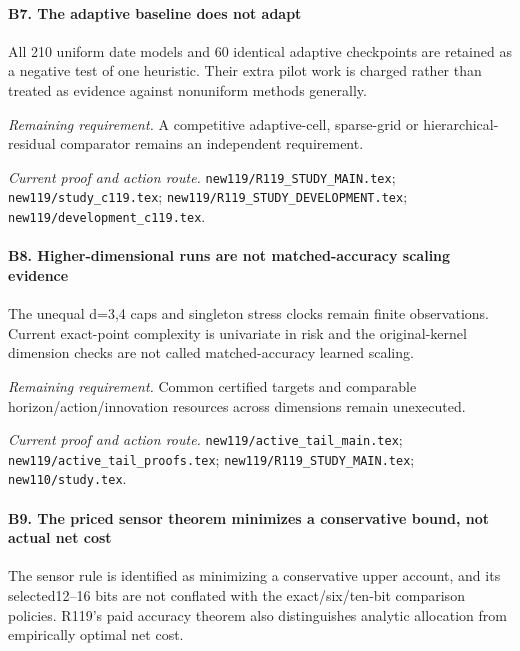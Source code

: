 \paragraph{B7. The adaptive baseline does not adapt}

All 210 uniform date models and 60 identical adaptive checkpoints are retained as a negative test of one heuristic. Their extra pilot work is charged rather than treated as evidence against nonuniform methods generally.

\par\emph{Remaining requirement.} A competitive adaptive-cell, sparse-grid or hierarchical-residual comparator remains an independent requirement.

\par\emph{Current proof and action route.} \nolinkurl{new119/R119_STUDY_MAIN.tex}; \nolinkurl{new119/study_c119.tex}; \nolinkurl{new119/R119_STUDY_DEVELOPMENT.tex}; \nolinkurl{new119/development_c119.tex}.

\paragraph{B8. Higher-dimensional runs are not matched-accuracy scaling evidence}

The unequal d=3,4 caps and singleton stress clocks remain finite observations. Current exact-point complexity is univariate in risk and the original-kernel dimension checks are not called matched-accuracy learned scaling.

\par\emph{Remaining requirement.} Common certified targets and comparable horizon/\allowbreak{}action/\allowbreak{}innovation resources across dimensions remain unexecuted.

\par\emph{Current proof and action route.} \nolinkurl{new119/active_tail_main.tex}; \nolinkurl{new119/active_tail_proofs.tex}; \nolinkurl{new119/R119_STUDY_MAIN.tex}; \nolinkurl{new110/study.tex}.

\paragraph{B9. The priced sensor theorem minimizes a conservative bound, not actual net cost}

The sensor rule is identified as minimizing a conservative upper account, and its selected12--16 bits are not conflated with the exact/\allowbreak{}six/\allowbreak{}ten-bit comparison policies. R119's paid accuracy theorem also distinguishes analytic allocation from empirically optimal net cost.

